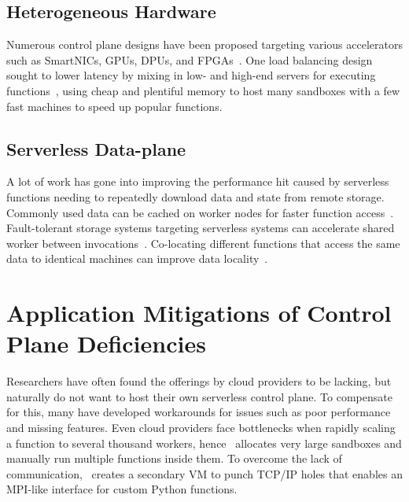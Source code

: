 \subsection{Heterogeneous Hardware}

Numerous control plane designs have been proposed targeting various accelerators such as SmartNICs, GPUs, DPUs, and FPGAs~\cite{choi2020lambda,du2022serverless,pemberton2022kernel,daw2021speedo}.
One load balancing design sought to lower latency by mixing in low- and high-end servers for executing functions~\cite{roy2022icebreaker}, using cheap and plentiful memory to host many sandboxes with a few fast machines to speed up popular functions.

\subsection{Serverless Data-plane}

A lot of work has gone into improving the performance hit caused by serverless functions needing to repeatedly download data and state from remote storage.
Commonly used data can be cached on worker nodes for faster function access~\cite{mvondo2021ofc,romero2021faa}.
Fault-tolerant storage systems targeting serverless systems can accelerate shared worker between invocations~\cite{giantsidi2023flexlog,sreekanti2020fault}.
Co-locating different functions that access the same data to identical machines can improve data locality~\cite{abdi2023palette}.

\section{Application Mitigations of Control Plane Deficiencies}

Researchers have often found the offerings by cloud providers to be lacking, but naturally do not want to host their own serverless control plane.
To compensate for this, many have developed workarounds for issues such as poor performance and missing features.
Even cloud providers face bottlenecks when rapidly scaling a function to several thousand workers, hence~\cite{basu2023propack} allocates very large sandboxes and manually run multiple functions inside them.
To overcome the lack of communication,~\cite{copik2023fmi} creates a secondary VM to punch TCP/IP holes that enables an MPI-like interface for custom Python functions.



